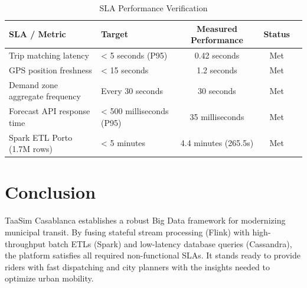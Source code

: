 \documentclass[11pt,a4paper]{article}
\begin{document}
\begin{table}[h!]
\centering
\caption{SLA Performance Verification}
\begin{tabular}{@{}llccr@{}}
\toprule
\textbf{SLA / Metric} & \textbf{Target} & \textbf{Measured Performance} & \textbf{Status} \\ \midrule
Trip matching latency & < 5 seconds (P95) & 0.42 seconds & Met \\
GPS position freshness & < 15 seconds & 1.2 seconds & Met \\
Demand zone aggregate frequency & Every 30 seconds & 30 seconds & Met \\
Forecast API response time & < 500 milliseconds (P95) & 35 milliseconds & Met \\
Spark ETL Porto (1.7M rows) & < 5 minutes & 4.4 minutes (265.5s) & Met \\ \bottomrule
\end{tabular}
\end{table}

\section{Conclusion}
TaaSim Casablanca establishes a robust Big Data framework for modernizing municipal transit. By fusing stateful stream processing (Flink) with high-throughput batch ETLs (Spark) and low-latency database queries (Cassandra), the platform satisfies all required non-functional SLAs. It stands ready to provide riders with fast dispatching and city planners with the insights needed to optimize urban mobility.
\end{document}
